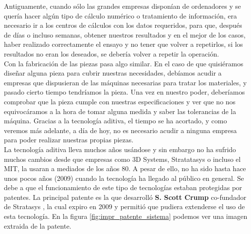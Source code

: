 Antiguamente, cuando sólo las grandes empresas disponían de ordenadores y se quería hacer algún tipo de cálculo numérico o tratamiento de información, era necesario ir a los centros de cálculos con los datos requeridos, para que, después de días o incluso semanas, obtener nuestros resultados y en el mejor de los casos, haber realizado correctamente el ensayo y no tener que volver a repetirlos, si los resultados no eran los deseados, se debería volver a repetir la operación.\\

Con la fabricación de las piezas pasa algo similar. En el caso de que quisiéramos diseñar alguna pieza para cubrir nuestras necesidades, debíamos acudir a empresas que dispusieran de las máquinas necesarias para tratar los materiales, y pasado cierto tiempo tendríamos la pieza. Una vez en nuestro poder, deberíamos comprobar que la pieza cumple con nuestras especificaciones y ver que no nos equivocáramos a la hora de tomar alguna medida y saber las tolerancias de la máquina. Gracias a la tecnología aditiva, el tiempo se ha acortado, y como veremos más adelante, a día de hoy, no es necesario acudir a ninguna empresa para poder realizar nuestras propias piezas.\\

La tecnología aditiva lleva muchos años usándose y sin embargo no ha sufrido muchos cambios desde que empresas como 3D Systems, Stratatasys o incluso el MIT, la usaran a mediados de los años 80. A pesar de ello, no ha sido hasta hace unos pocos años (2009) cuando la tecnología ha llegado al público en general. Se debe a que el funcionamiento de este tipo de tecnologías estaban protegidas por patentes. La principal patente es la que desarrolló \textbf{S. Scott Crump} co-fundador de Stratasys \cite{crump1992apparatus}, la cual expiro en 2009 y permitió que pudiera extenderse el uso de esta tecnología. En la figura \ref{fig:impr_patente_sistema} podemos ver una imagen extraida de la patente.\\

